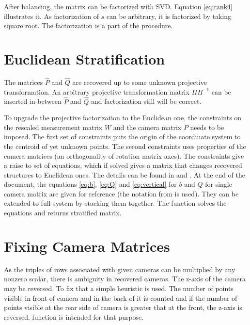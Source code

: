 \documentclass[12pt]{article}
\begin{document}
After balancing, the matrix can be factorized with SVD. Equation \ref{eq:rank4} illustrates it. As factorization of $s$ can be arbitrary, it is factorized by taking square root. The factorization is a part of the  procedure.



\section{Euclidean Stratification}

The matrices $\hat{P}$ and $\hat{Q}$ are recovered up to some unknown projective transformation. An arbitrary projective transformation matrix $HH^{-1}$ can be inserted in-between $\hat{P}$ and $\hat{Q}$ and factorization still will be correct.


To upgrade the projective factorization to the Euclidean one, the constraints on the rescaled measurement matrix $W$ and the camera matrix $P$ needs to be imposed. The first set of constraints puts the origin of the coordinate system to the centroid of yet unknown points. The second constraints uses properties of the camera matrices (an orthogonality of rotation matrix axes). The constraints give a raise to set of equations, which if solved gives a matrix that changes recovered structures to Euclidean ones. The details can be found in \cite{svoboda05} and \cite{han00}. At the end of the document, the equations \ref{eq:b}, \ref{eq:Q} and \ref{eq:vertical} for $b$ and $Q$ for single camera matrix are given for reference (the notation from \cite{svoboda05} is used). They can be extended to full system by stacking them together. The function  solves the equations and returns stratified matrix.

\newpage

\section{Fixing Camera Matrices}

As the triples of rows associated with given cameras can be multiplied by any nonzero scalar, there is ambiguity in recovered cameras. The z-axis of the camera may be reversed. To fix that a simple heuristic is used. The number of points visible in front of camera and in the back of it is counted and if the number of points visible at the rear side of camera is greater that at the front, the z-axis is reversed.  function is intended for that purpose.
\end{document}
